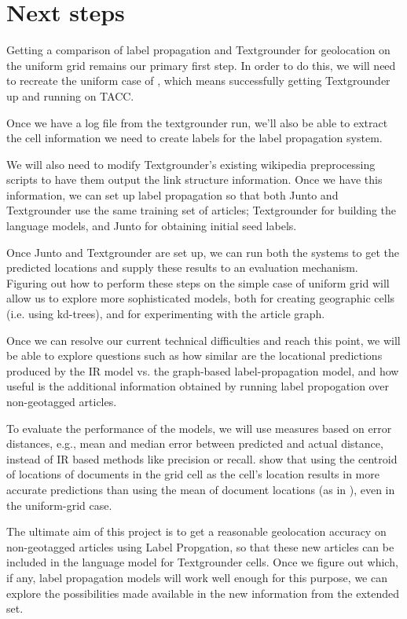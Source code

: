 \section{Next steps}
Getting a comparison of label propagation and Textgrounder for geolocation on
the uniform grid remains our primary first step.
In order to do this, we will need to recreate the uniform case of
\cite{rolleretal:12}, which means successfully getting Textgrounder up and
running on TACC.
\par
Once we have a log file from the textgrounder run, we'll also be able to extract the cell information we
need to create labels for the label propagation system. 
\par We will also need to modify Textgrounder's existing wikipedia preprocessing scripts to have them output the link structure information. Once we have this information, we can set up label propagation so that both Junto and Textgrounder use the same training set of articles; Textgrounder for building the language models, and Junto for obtaining initial seed labels.
\par
Once Junto and Textgrounder are set up, we can run both the systems to get the predicted locations and supply these results to an evaluation mechanism.
Figuring out how to perform these steps on the simple case of uniform grid will allow us to
explore more sophisticated models, both for creating geographic cells (i.e.
using kd-trees), and for experimenting with the article graph.
\par
Once we can resolve our current technical difficulties and reach this point, we
will be able to explore questions such as how similar are the locational
predictions produced by the IR model vs. the graph-based label-propagation
model, and how useful is the additional information obtained by running label propogation over non-geotagged articles.
\par
To evaluate the performance of the models, we will use measures based on error distances, e.g., mean and median error between predicted and actual distance, instead of IR based methods like precision or recall.
\cite{rolleretal:12} show that using the centroid of locations of documents in the grid cell as the cell's location results in more accurate predictions than using the mean of document locations (as in \cite{wing-baldridge:11}), even in the uniform-grid case.
\par
The ultimate aim of this project is to get a reasonable geolocation accuracy on non-geotagged articles using Label Propgation, so that these new articles can be included in the language model for Textgrounder cells.
Once we figure out which, if any, label propagation models will work well
enough for this purpose, we can explore the possibilities made available in the
new information from the extended set.